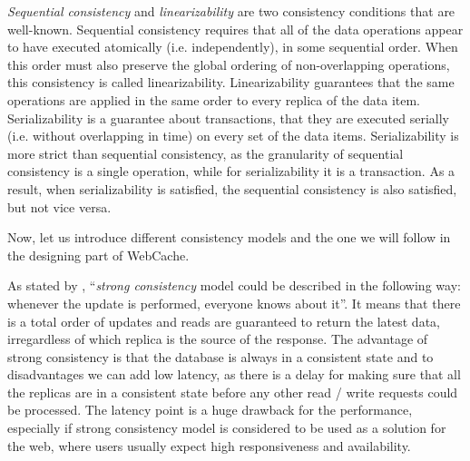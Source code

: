 \textit{Sequential consistency} and \textit{linearizability} are two consistency conditions that are well-known. Sequential consistency requires that all of the data operations appear to have executed atomically (i.e. independently), in some sequential order. When this order must also preserve the global ordering of non-overlapping operations, this consistency is called linearizability\cite{27}. Linearizability guarantees that the same operations are applied in the same order to every replica of the data item\cite{12}. Serializability is a guarantee about transactions, that they are executed serially (i.e. without overlapping in time) on every set of the data items\cite{12}. Serializability is more strict than sequential consistency, as the granularity of sequential consistency is a single operation, while for serializability it is a transaction. As a result, when serializability is satisfied, the sequential consistency is also satisfied, but not vice versa.

Now, let us introduce different consistency models and the one we will follow in the designing part of WebCache. 

As stated by \citet{10}, ``\textit{strong consistency} model could be described in the following way: whenever the update is performed, everyone knows about it''. It means that there is a total order of updates and reads are guaranteed to return the latest data, irregardless of which replica is the source of the response. The advantage of strong consistency is that the database is always in a consistent state and to disadvantages we can add low latency, as there is a delay for making sure that all the replicas are in a consistent state before any other read / write requests could be processed. The latency point is a huge drawback for the performance, especially if strong consistency model is considered to be used as a solution for the web, where users usually expect high responsiveness and availability. 

